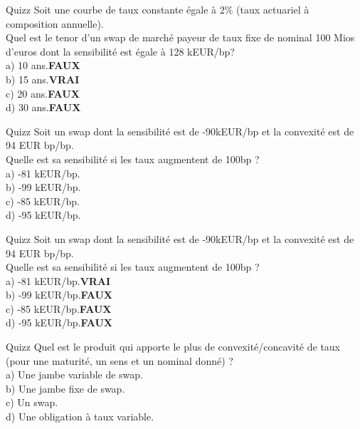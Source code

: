 \documentclass{beamer}
\begin{document}
\begin{frame}{Quizz}
Soit une courbe de taux constante égale à 2\% (taux actuariel à composition annuelle).\\
\vspace{0.5cm}
Quel est le tenor d'un swap de marché payeur de taux fixe de nominal 100 Mios d'euros dont la sensibilité est égale à 128 kEUR/bp?\\
\vspace{0.5cm}
a) 10 ans.\textbf{\color{red}FAUX}\\
b) 15 ans.\textbf{\color{green}VRAI}\\
c) 20 ans.\textbf{\color{red}FAUX}\\
d) 30 ans.\textbf{\color{red}FAUX}\\
\end{frame}

\begin{frame}{Quizz}
Soit un swap dont la sensibilité est de -90kEUR/bp et la convexité est de 94 EUR bp/bp.\\
\vspace{0.5cm}
Quelle est sa sensibilité si les taux augmentent de 100bp ?\\
a) -81 kEUR/bp.\\
b) -99 kEUR/bp.\\
c) -85 kEUR/bp.\\
d) -95 kEUR/bp.\\
\end{frame}


\begin{frame}{Quizz}
Soit un swap dont la sensibilité est de -90kEUR/bp et la convexité est de 94 EUR bp/bp.\\
\vspace{0.5cm}
Quelle est sa sensibilité si les taux augmentent de 100bp ?\\
a) -81 kEUR/bp.\textbf{\color{green}VRAI}\\
b) -99 kEUR/bp.\textbf{\color{red}FAUX}\\
c) -85 kEUR/bp.\textbf{\color{red}FAUX}\\
d) -95 kEUR/bp.\textbf{\color{red}FAUX}\\
\end{frame}

\begin{frame}{Quizz}
Quel est le produit qui apporte le plus de convexité/concavité de taux (pour une maturité, un sens et un nominal donné) ?\\
\vspace{0.5cm}
a) Une jambe variable de swap.\\
b) Une jambe fixe de swap.\\
c) Un swap.\\
d) Une obligation à taux variable.\\
\end{frame}
\end{document}
